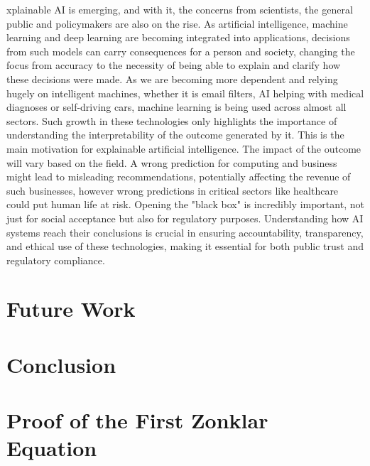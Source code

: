 \documentclass[10pt,journal,compsoc]{IEEEtran}
\begin{document}
xplainable AI is emerging, and with it, the concerns from scientists, the general public and policymakers are also on the rise. As artificial intelligence, machine learning and deep learning are becoming integrated into applications, decisions from such models can carry consequences for a person and society, changing the focus from accuracy to the necessity of being able to explain and clarify how these decisions were made.\cite{analytical-review} As we are becoming more dependent and relying hugely on intelligent machines, whether it is email filters, AI helping with medical diagnoses or self-driving cars, machine learning is being used across almost all sectors. Such growth in these technologies only highlights the importance of understanding the interpretability of the outcome generated by it. This is the main motivation for explainable artificial intelligence.\cite{doshivelez2017rigorous} 
The impact of the outcome will vary based on the field. A wrong prediction for computing and business might lead to misleading recommendations, potentially affecting the revenue of such businesses, however wrong predictions in critical sectors like healthcare could put human life at risk. Opening the "black box" is incredibly important, not just for social acceptance but also for regulatory purposes. Understanding how AI systems reach their conclusions is crucial in ensuring accountability, transparency, and ethical use of these technologies, making it essential for both public trust and regulatory compliance.\cite{analytical-review}


\section{Future Work}


\section{Conclusion}


\appendices
\section{Proof of the First Zonklar Equation}


\section{}


\printbibliography
\end{document}
